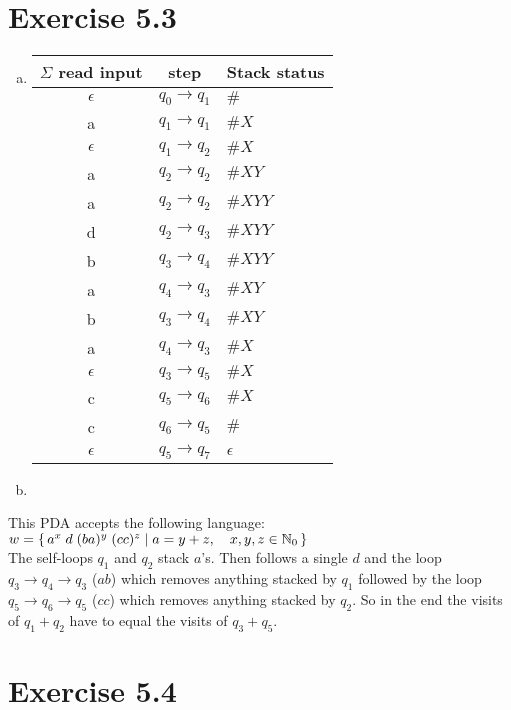 \documentclass{article} %
\newcommand{\homeworkNumber}{5}
\begin{document}
\section*{Exercise \homeworkNumber.3}
\begin{enumerate}[(a)]
	\item
	\renewcommand{\arraystretch}{1.25}
	\begin{tabular}{ c | c | l }
	$\Sigma$ read input & step & Stack status\\
	\hline
	$\epsilon$ & $q_0 \to q_1$ & $\#$\\
	a & $q_1 \to q_1$ & $\#X$\\
	$\epsilon$ & $q_1 \to q_2$ & $\#X$\\
	a & $q_2 \to q_2$ & $\#XY$\\
	a & $q_2 \to q_2$ & $\#XYY$\\
	d & $q_2 \to q_3$ & $\#XYY$\\
	b & $q_3 \to q_4$ & $\#XYY$\\
	a & $q_4 \to q_3$ & $\#XY$\\
	b & $q_3 \to q_4$ & $\#XY$\\
	a & $q_4 \to q_3$ & $\#X$\\
	$\epsilon$ & $q_3 \to q_5$ & $\#X$\\
	c & $q_5 \to q_6$ & $\#X$\\
	c & $q_6 \to q_5$ & $\#$\\
	$\epsilon$ & $q_5 \to q_7$ & $\epsilon$\\
	\end{tabular}
	
	\item
	\end{enumerate}
	This PDA accepts the following language: 
	$w = \set{a^x \; d \; (ba)^y \; (cc)^z \mid a = y+z,\quad x,y,z \in \mathbb{N}_0}$\\
	The self-loops $q_1$ and $q_2$ stack $a$'s. Then follows a single $d$ and the loop $q_3 \to q_4 \to q_3$ ($ab$) which removes anything stacked by $q_1$ followed by the loop $q_5 \to q_6 \to q_5$ ($cc$) which removes anything stacked by $q_2$. So in the end the visits of $q_1 + q_2$ have to equal the visits of $q_3 + q_5$.


\section*{Exercise \homeworkNumber.4}
\end{document}
